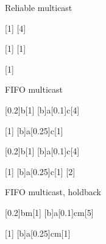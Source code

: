 \documentclass[tikz]{standalone}
\begin{document}
  \begin{msc}{Reliable multicast}

     [1]
     [4]

     \nextlevel[2]

     [1]
     [1]

     \nextlevel[3]
     \nextlevel[2]


     [1]

  \end{msc}
  \begin{msc}{FIFO multicast}

     \nextlevel[2]

     [0.2]{b}[1]
     [b]{a}[0.1]{c}[4]
     \nextlevel[2]

     [1]
     [b]{a}[0.25]{c}[1]
     \nextlevel[3]

     \nextlevel[2]
     
     [0.2]{b}[1]
     [b]{a}[0.1]{c}[4]
     \nextlevel[2]

     [1]
     [b]{a}[0.25]{c}[1]
     \nextlevel[1]
     [2]

  \end{msc}

  \begin{msc}{FIFO multicast, holdback}

     
     [0.2]{bm}[1]
     [b]{a}[0.1]{cm}[5]
     

     \nextlevel[1]
     \nextlevel[1]

     [1]
     [b]{a}[0.25]{cm}[1]
     \nextlevel[1]
     \nextlevel[2]

     \nextlevel[1]
     

  \end{msc}
\end{document}
